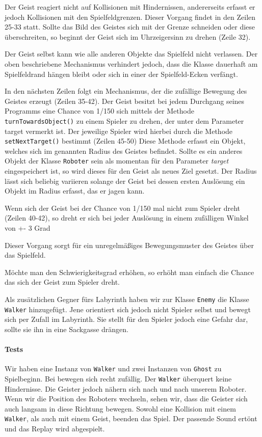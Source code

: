 \documentclass{pi1}
\begin{document}
Der Geist reagiert nicht auf Kollisionen mit Hindernissen, andererseits erfasst er jedoch Kollisionen mit den Spielfeldgrenzen. Dieser Vorgang findet in den Zeilen 25-33 statt. Sollte das Bild des Geistes sich mit der Grenze schneiden oder diese überschreiten, so beginnt der Geist sich im Uhrzeigersinn zu drehen (Zeile 32).

Der Geist selbst kann wie alle anderen Objekte das Spielfeld nicht verlassen. Der oben beschriebene Mechanismus verhindert jedoch, dass die Klasse dauerhaft am Spielfeldrand hängen bleibt oder sich in einer der Spielfeld-Ecken verfängt. 

In den nächsten Zeilen folgt ein Mechanismus, der die zufällige Bewegung des Geistes erzeugt (Zeilen 35-42).
Der Geist besitzt bei jedem Durchgang seines Programms eine Chance von 1/150 sich mittels der Methode  \texttt{turnTowardsObject()} zu einem Spieler zu drehen, der unter dem Parameter target vermerkt ist.\newline
Der jeweilige Spieler wird hierbei durch die Methode  \texttt{setNextTarget()} bestimmt (Zeilen 45-50)\newline
Diese Methode erfasst ein Objekt, welches sich im genannten Radius des Geistes befindet. Sollte es ein anderes Objekt der Klasse  \texttt{Roboter} sein als momentan für den Parameter  \emph{target} eingespeichert ist, so wird dieses für den Geist als neues Ziel gesetzt.\newline
Der Radius lässt sich beliebig variieren solange der Geist bei dessen ersten Auslösung ein Objekt im Radius erfasst, das er jagen kann.

Wenn sich der Geist bei der Chance von 1/150 mal nicht zum Spieler dreht (Zeilen 40-42), so dreht er sich bei jeder Auslösung in einem zufälligen Winkel von +- 3 Grad

Dieser Vorgang sorgt für ein unregelmäßiges Bewegungsmuster des Geistes über das Spielfeld.

Möchte man den Schwierigkeitsgrad erhöhen, so erhöht man einfach die Chance das sich der Geist zum Spieler dreht.

Als zusätzlichen Gegner fürs Labyrinth haben wir zur Klasse  \texttt{Enemy} die Klasse  \texttt{Walker} hinzugefügt. Jene orientiert sich jedoch nicht Spieler selbst und bewegt sich per Zufall im Labyrinth.
Sie stellt für den Spieler jedoch eine Gefahr dar, sollte sie ihn in eine Sackgasse drängen.

\paragraph{Tests} Wir haben eine Instanz von \texttt{Walker} und zwei Instanzen von \texttt{Ghost} zu Spielbeginn. Bei bewegen sich recht zufällig. Der \texttt{Walker} überquert keine Hindernisse. Die Geister jedoch nähern sich nach und nach unserem Roboter. Wenn wir die Position des Roboters wechseln, sehen wir, dass die Geister sich auch langsam in diese Richtung bewegen. Sowohl eine Kollision mit einem \texttt{Walker}, als auch mit einem Geist, beenden das Spiel. Der passende Sound ertönt und das Replay wird abgespielt.
\end{document}
